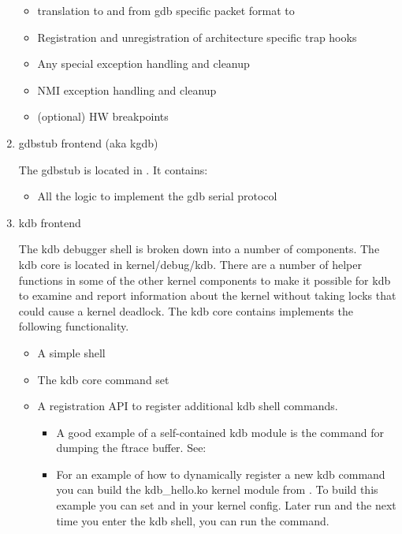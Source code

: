 \documentclass[a4paper,8pt,english]{sphinxmanual}
\begin{document}
\begin{enumerate}
\begin{itemize}
\item {} 
translation to and from gdb specific packet format to 

\item {} 
Registration and unregistration of architecture specific trap
hooks

\item {} 
Any special exception handling and cleanup

\item {} 
NMI exception handling and cleanup

\item {} 
(optional) HW breakpoints

\end{itemize}

\item {} 
gdbstub frontend (aka kgdb)

The gdbstub is located in . It contains:
\begin{itemize}
\item {} 
All the logic to implement the gdb serial protocol

\end{itemize}

\item {} 
kdb frontend

The kdb debugger shell is broken down into a number of components.
The kdb core is located in kernel/debug/kdb. There are a number of
helper functions in some of the other kernel components to make it
possible for kdb to examine and report information about the kernel
without taking locks that could cause a kernel deadlock. The kdb core
contains implements the following functionality.
\begin{itemize}
\item {} 
A simple shell

\item {} 
The kdb core command set

\item {} 
A registration API to register additional kdb shell commands.
\begin{itemize}
\item {} 
A good example of a self-contained kdb module is the 
command for dumping the ftrace buffer. See:

\item {} 
For an example of how to dynamically register a new kdb command
you can build the kdb\_hello.ko kernel module from
. To build this example you can set
 and  in your kernel
config. Later run  and the next time you
enter the kdb shell, you can run the  command.


\end{itemize}
\end{itemize}
\end{enumerate}
\end{document}
